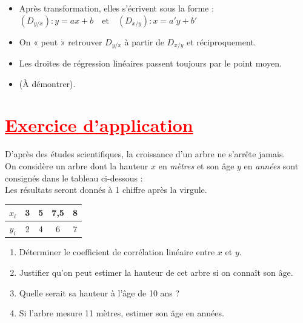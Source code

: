 \documentclass[12pt,a4paper]{article}
\begin{document}
\begin{itemize}
    \item Après transformation, elles s’écrivent sous la forme : \\
    \( (D_{y/x}) : y = ax + b \quad \text{et} \quad (D_{x/y}) : x = a'y + b' \)
    
    \item On « peut » retrouver \( D_{y/x} \) à partir de \( D_{x/y} \) et réciproquement.

    \item Les droites de régression linéaires passent toujours par le point moyen.

    \item 
     \quad (À démontrer).
\end{itemize}
\noindent
\section*{\textcolor{red}{\underline{Exercice d’application}}}

D’après des études scientifiques, la croissance d’un arbre ne s’arrête jamais.\\
On considère un arbre dont la hauteur \( x \) en \textit{mètres} et son âge \( y \) en \textit{années} sont consignés dans le tableau ci-dessous :\\
Les résultats seront donnés à 1 chiffre après la virgule.

\vspace{0.5cm}

\begin{tabular}{|c|c|c|c|c|}
\hline
\( x_i \) & 3 & 5 & 7{,}5 & 8 \\
\hline
\( y_i \) & 2 & 4 & 6 & 7 \\
\hline
\end{tabular}

\vspace{0.5cm}

\begin{enumerate}
    \item Déterminer le coefficient de corrélation linéaire entre \( x \) et \( y \).
    \item Justifier qu’on peut estimer la hauteur de cet arbre si on connaît son âge.
    \item Quelle serait sa hauteur à l’âge de 10 ans ?
    \item Si l’arbre mesure 11 mètres, estimer son âge en années.
\end{enumerate}
\end{document}

